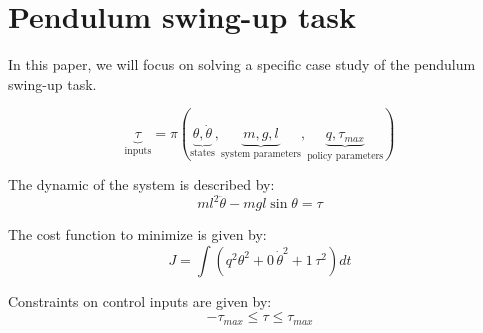 \newpage
\section{Pendulum swing-up task}
In this paper, we will focus on solving a specific case study of the pendulum swing-up task. 

\begin{equation}
\underbrace{\tau}_{\text{inputs}}
=
\pi \left(
\underbrace{ \theta, \dot{\theta} }_{\text{states}},
\underbrace{ m , g , l }_{\text{system parameters}},
\underbrace{ q , \tau_{max} }_{\text{policy parameters}}
\right)
\end{equation}

The dynamic of the system is described by:
\begin{equation}
ml^2 \ddot{\theta} - mgl \sin \theta = \tau
\end{equation}

The cost function to minimize is given by:
\begin{equation}
J = \int{( q^2 \theta^2 + 0 \, \dot{\theta}^2 + 1 \, \tau^2 ) dt }
\end{equation}

Constraints on control inputs are given by:
\begin{equation}
- \tau_{max} \leq \tau \leq \tau_{max}
\end{equation}

